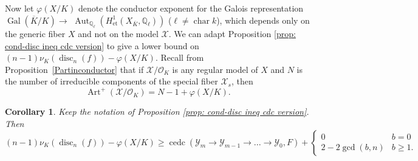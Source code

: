 \documentclass[12pt]{amsart}
\numberwithin{equation}{section}
\newtheorem{corollary}[equation]{Corollary}
\theoremstyle{definition}
\newcommand{\mc}[1]{\mathcal{#1}}
\newcommand{\Q}{\mathbb Q}
\renewcommand{\phi}{\varphi}
\newcommand{\Y}{\mathcal{Y}}
\DeclareMathOperator{\Gal}{Gal}
\DeclareMathOperator{\disc}{disc}
\DeclareMathOperator{\cha}{char}
\DeclareMathOperator{\Art}{Art}
\DeclareMathOperator{\Aut}{Aut}
\DeclareMathOperator{\cedc}{cedc}
\begin{document}
Now let $\phi(X/K)$ denote the conductor exponent for the Galois
representation $\Gal (\overline{K}/K) \rightarrow $ $\Aut_{\Q_\ell}
(H^1_{\mathrm{et}}(X_{\overline{K}}, \Q_\ell))$ ($\ell \neq \cha k$),
which depends only on the generic fiber $X$ and not on the model $\mc{X}$. We can adapt Proposition \ref{prop:
  cond-disc ineq cdc version} to give a lower bound on
$(n-1)\nu_K(\disc_n(f))-\phi(X/K)$.  Recall from
Proposition~\ref{Partinconductor} that if $\mc{X}/\mc{O}_K$ is any regular model of $X$ and $N$ is the number of irreducible components of the special fiber $\mc{X}_{s}$, then
\begin{equation}\label{Eliu}
  \Art^+(\mc{X}/\mc{O}_K) = N - 1 + \phi(X/K).
\end{equation}


\begin{corollary}\label{cor: exp-disc ineq cedc version}
    Keep the notation of Proposition \ref{prop: cond-disc ineq cdc version}. Then
    \[(n-1)\nu_K(\disc_n(f))-\phi(X/K) \geq \cedc(\Y_m\to\Y_{m-1}\to...\to\Y_0,F)+\begin{cases}
            0&b=0\\
            2-2\gcd(b,n)&b\geq1.
        \end{cases}\] 
\end{corollary}
\end{document}
